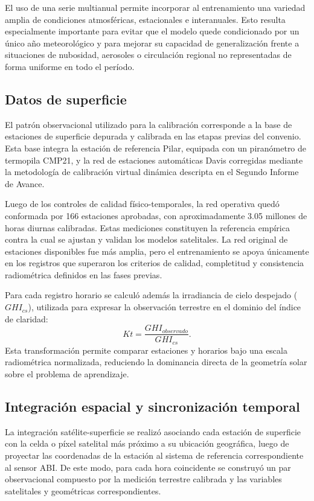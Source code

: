 \documentclass[../main.tex]{subfiles}
\begin{document}
El uso de una serie multianual permite incorporar al entrenamiento una variedad amplia de condiciones atmosféricas, estacionales e interanuales. Esto resulta especialmente importante para evitar que el modelo quede condicionado por un único año meteorológico y para mejorar su capacidad de generalización frente a situaciones de nubosidad, aerosoles o circulación regional no representadas de forma uniforme en todo el período.

\subsection{Datos de superficie}

El patrón observacional utilizado para la calibración corresponde a la base de estaciones de superficie depurada y calibrada en las etapas previas del convenio. Esta base integra la estación de referencia Pilar, equipada con un piranómetro de termopila CMP21, y la red de estaciones automáticas Davis corregidas mediante la metodología de calibración virtual dinámica descripta en el Segundo Informe de Avance.

Luego de los controles de calidad físico-temporales, la red operativa quedó conformada por 166 estaciones aprobadas, con aproximadamente 3.05 millones de horas diurnas calibradas. Estas mediciones constituyen la referencia empírica contra la cual se ajustan y validan los modelos satelitales. La red original de estaciones disponibles fue más amplia, pero el entrenamiento se apoya únicamente en los registros que superaron los criterios de calidad, completitud y consistencia radiométrica definidos en las fases previas.

Para cada registro horario se calculó además la irradiancia de cielo despejado ($GHI_{cs}$), utilizada para expresar la observación terrestre en el dominio del índice de claridad:
\begin{equation}
Kt = \frac{GHI_{observado}}{GHI_{cs}}.
\end{equation}
Esta transformación permite comparar estaciones y horarios bajo una escala radiométrica normalizada, reduciendo la dominancia directa de la geometría solar sobre el problema de aprendizaje.

\subsection{Integración espacial y sincronización temporal}

La integración satélite-superficie se realizó asociando cada estación de superficie con la celda o píxel satelital más próximo a su ubicación geográfica, luego de proyectar las coordenadas de la estación al sistema de referencia correspondiente al sensor ABI. De este modo, para cada hora coincidente se construyó un par observacional compuesto por la medición terrestre calibrada y las variables satelitales y geométricas correspondientes.
\end{document}
